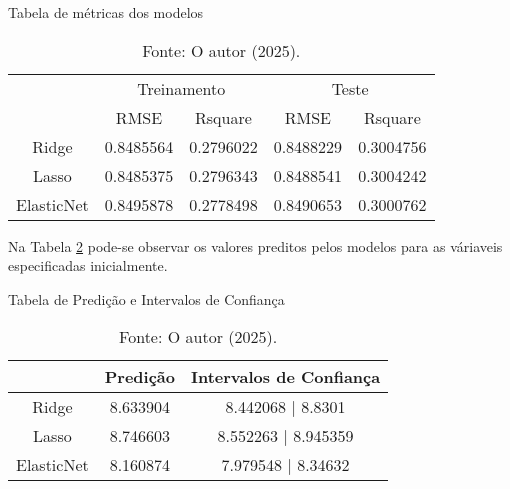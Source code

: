 \begin{table}[H]
\centering
\caption{Tabela de métricas dos modelos}
\begin{tabular}{c|c|c|c|c||}      
\cline{2-5}
    & \multicolumn{2}{c|}{Treinamento} & \multicolumn{2}{c||}{Teste}\\
\cline{2-5}
    & RMSE & Rsquare & RMSE & Rsquare\\
\cline{1-5}
\multicolumn{1}{||c|}{Ridge} & \cellcolor[HTML]{FFF8B8} 0.8485564 & \cellcolor[HTML]{FFF8B8} 0.2796022 & \cellcolor[HTML]{CAF2C2} 0.8488229 & \cellcolor[HTML]{CAF2C2} 0.3004756 \\
\cline{1-5}
\multicolumn{1}{||c|}{Lasso} & \cellcolor[HTML]{CAF2C2} 0.8485375 & \cellcolor[HTML]{CAF2C2} 0.2796343 & \cellcolor[HTML]{FFF8B8} 0.8488541 & \cellcolor[HTML]{FFF8B8} 0.3004242 \\
\cline{1-5}
\multicolumn{1}{||c|}{ElasticNet} & \cellcolor[HTML]{FFD6C9} 0.8495878 & \cellcolor[HTML]{FFD6C9} 0.2778498 & \cellcolor[HTML]{FFD6C9} 0.8490653 & \cellcolor[HTML]{FFD6C9} 0.3000762 \\                
\hline
\end{tabular}
\caption*{Fonte: O autor (2025).}
\label{tab:metricas}
\end{table}

Na Tabela \ref{tab:predicao} pode-se observar os valores preditos pelos modelos para as váriaveis especificadas inicialmente.

\begin{table}[H]
\centering
\caption{Tabela de Predição e Intervalos de Confiança}
\begin{tabular}{c|c|c||}       
\cline{2-3}
           & \multicolumn{1}{c|}{Predição} & Intervalos de Confiança \\
\hline
\multicolumn{1}{||c|}{Ridge}      & 8.633904 & 8.442068 | 8.8301     \\
\hline
\multicolumn{1}{||c|}{Lasso}      & 8.746603 & 8.552263 | 8.945359     \\
\hline
\multicolumn{1}{||c|}{ElasticNet} & 8.160874 & 7.979548 | 8.34632    \\
\hline
\end{tabular}
\caption*{Fonte: O autor (2025).}
\label{tab:predicao}
\end{table}